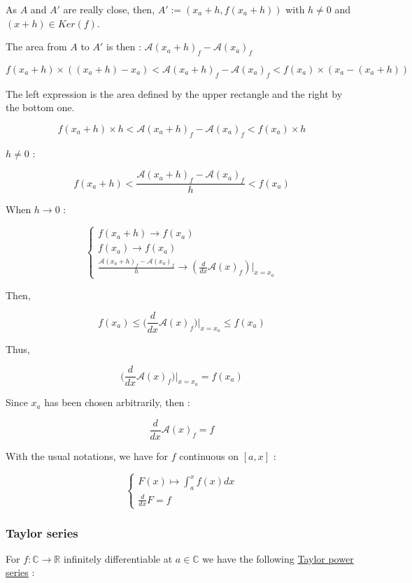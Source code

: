 \documentclass[12pt]{article}
\begin{document}
As $A$ and $A'$ are really close, then, $A' := (x_a+h, f(x_a+h))$ with $h \neq 0$ and $(x+h) \in Ker(f)$.

The area from $A$ to $A'$ is then : $\mathcal{A}(x_a+h)_f - \mathcal{A}(x_a)_f$

$$ 
f(x_a +h) \times ( (x_a+h)-x_a) < \mathcal{A}(x_a+h)_f - \mathcal{A}(x_a)_f < f(x_a) \times ( x_a-(x_a+h))
$$

The left expression is the area defined by the upper rectangle and the right by the bottom one.

$$ 
f(x_a +h) \times h < \mathcal{A}(x_a+h)_f - \mathcal{A}(x_a)_f < f(x_a) \times h
$$

$h \neq 0$ :

$$ 
f(x_a +h) < \frac{\mathcal{A}(x_a+h)_f - \mathcal{A}(x_a)_f}{h} < f(x_a)
$$

When $h \rightarrow 0$ :

$$
\begin{cases}
f(x_a +h) \rightarrow f(x_a) \\
f(x_a) \rightarrow f(x_a) \\
\frac{\mathcal{A}(x_a+h)_f - \mathcal{A}(x_a)_f}{h} \rightarrow (\frac{d}{dx} \mathcal{A}(x)_f)|_{x=x_a}
\end{cases}
$$

Then,

$$ 
f(x_a) \leq  \big( \frac{d}{dx} \mathcal{A}(x)_f \big)|_{x=x_a} \leq f(x_a)
$$

Thus,

$$
\big( \frac{d}{dx} \mathcal{A}(x)_f \big)|_{x=x_a} = f(x_a)
$$

Since $x_a$ has been chosen arbitrarily, then :

$$
\frac{d}{dx} \mathcal{A}(x)_f = f
$$

With the usual notations, we have for $f$ continuous on $[a, x]$ :

$$
\begin{cases}
F(x) \mapsto \int_a^x f(x)dx \\
\frac{d}{dx}F = f
\end{cases}
$$

\subsubsection{Taylor series}

For $f: \mathbb{C} \rightarrow \mathbb{R}$ infinitely differentiable at $a \in \mathbb{C}$ we have the following \href{https://en.wikipedia.org/wiki/Taylor_series}{Taylor power series} :
\end{document}
